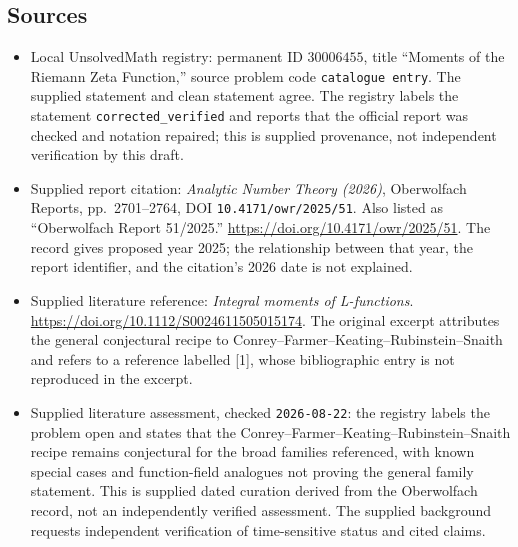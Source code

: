 \documentclass[11pt]{article}
\begin{document}
\subsection{Sources}
\begin{itemize}
\item Local UnsolvedMath registry: permanent ID \(30006455\), title ``Moments of the Riemann Zeta Function,'' source problem code \texttt{catalogue entry}. The supplied statement and clean statement agree. The registry labels the statement \texttt{corrected\_verified} and reports that the official report was checked and notation repaired; this is supplied provenance, not independent verification by this draft.
\item Supplied report citation: \emph{Analytic Number Theory (2026)}, Oberwolfach Reports, pp.\ 2701--2764, DOI \texttt{10.4171/owr/2025/51}. Also listed as ``Oberwolfach Report 51/2025.'' \url{https://doi.org/10.4171/owr/2025/51}. The record gives proposed year 2025; the relationship between that year, the report identifier, and the citation's 2026 date is not explained.
\item Supplied literature reference: \emph{Integral moments of L-functions}. \url{https://doi.org/10.1112/S0024611505015174}. The original excerpt attributes the general conjectural recipe to Conrey--Farmer--Keating--Rubinstein--Snaith and refers to a reference labelled [1], whose bibliographic entry is not reproduced in the excerpt.
\item Supplied literature assessment, checked \texttt{2026-08-22}: the registry labels the problem open and states that the Conrey--Farmer--Keating--Rubinstein--Snaith recipe remains conjectural for the broad families referenced, with known special cases and function-field analogues not proving the general family statement. This is supplied dated curation derived from the Oberwolfach record, not an independently verified assessment. The supplied background requests independent verification of time-sensitive status and cited claims.
\end{itemize}
\end{document}
